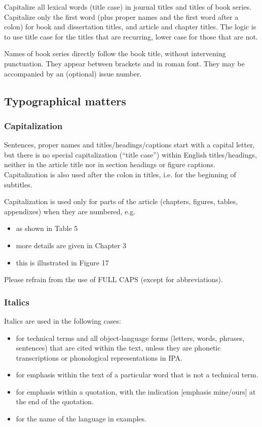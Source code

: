\documentclass[charis,linguex]{glossa}
\begin{document}
Capitalize all lexical words (title case) in journal titles and titles of book series. Capitalize only the first word (plus proper names and the first word after a colon) for book and dissertation titles, and article and chapter titles. The logic is to use title case for the titles that are recurring, lower case for those that are not.

Names of book series directly follow the book title, without intervening punctuation. They appear between brackets and in roman font. They may be accompanied by an (optional) issue number.

\subsection{Typographical matters}

\subsubsection{Capitalization}

Sentences, proper names and titles/headings/captions start with a capital letter, but there is no special capitalization (“title case”) within English titles/headings, neither in the article title nor in section headings or figure captions. Capitalization is also used after the colon in titles, i.e. for the beginning of subtitles.

Capitalization is used only for parts of the article (chapters, figures, tables, appendixes) when they are numbered, e.g.
\begin{itemize}
\item as shown in Table 5
\item more details are given in Chapter 3
\item this is illustrated in Figure 17
\end{itemize}

Please refrain from the use of FULL CAPS (except for abbreviations).

\subsubsection{Italics}
Italics are used in the following cases:
\sloppy
\begin{itemize}
\item for technical terms and all object-language forms (letters, words, phrases, sentences) that are cited within the text, unless they are phonetic transcriptions or phonological representations in IPA.
\item for emphasis within the text of a particular word that is not a technical term.
\item for emphasis within a quotation, with the indication [emphasis mine/ours] at the end of the quotation.
\item for the name of the language in examples.
\end{itemize}
\end{document}
